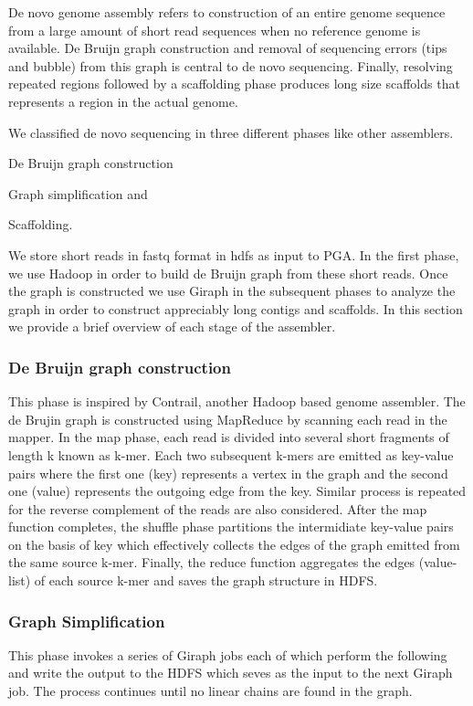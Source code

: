 De novo genome assembly refers to construction of an entire genome sequence from a large amount of short read sequences when no reference genome is available. 
De Bruijn graph construction  and removal of sequencing errors (tips and bubble) from this graph is central to de novo sequencing. 
Finally, resolving  repeated regions followed by a scaffolding phase produces long size scaffolds that represents a region in the actual genome.

We classified de novo sequencing in three different phases like other assemblers.
\begin{inparaenum}
\item De Bruijn graph construction
\item Graph simplification and
\item Scaffolding.
\end{inparaenum}
We store short reads in fastq format in hdfs as input to PGA.
In the first phase, we use Hadoop in order to build de Bruijn graph from these short reads. 
Once the graph is constructed we use Giraph in the subsequent phases to analyze the graph in order to construct appreciably long contigs and scaffolds.
In this section we provide a brief overview of each stage of the assembler.

\subsubsection {De Bruijn graph construction}
This phase is inspired by Contrail, another Hadoop based genome assembler.
The de Brujin graph is constructed using MapReduce by scanning each read in the mapper.
In the map phase, each read is divided into several short fragments of length k known as k-mer.
Each two subsequent k-mers are emitted as key-value pairs where the first one (key) represents a vertex in the graph and the second one (value) represents the outgoing edge from the key.
Similar process is repeated for the reverse complement of the reads are also considered.
After the map function completes, the shuffle phase partitions the intermidiate key-value pairs on the basis of key which effectively collects the edges of the graph emitted from the same source k-mer.
Finally, the reduce function aggregates the edges (value-list) of each source k-mer and saves the graph structure in HDFS.

\subsubsection {Graph Simplification}
This phase invokes a series of Giraph jobs each of which perform the following and write the output to the HDFS which seves as the input to the next Giraph job.
The process continues until no linear chains are found in the graph. 
 
